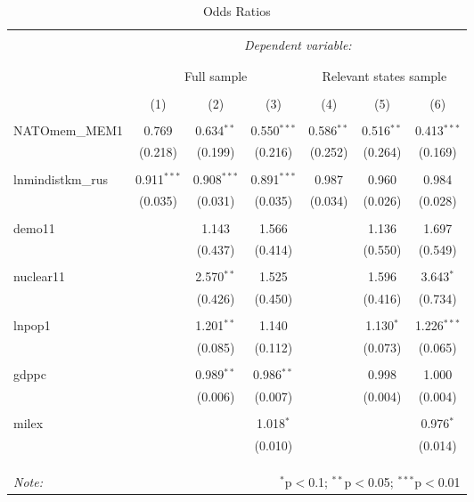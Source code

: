
\begin{table}[!htbp] \centering 
  \caption{Odds Ratios} 
  \label{} 
\begin{tabular}{@{\extracolsep{5pt}}lcccccc} 
\\[-1.8ex]\hline 
\hline \\[-1.8ex] 
 & \multicolumn{6}{c}{\textit{Dependent variable:}} \\ 
\cline{2-7} 
\\[-1.8ex] & \multicolumn{6}{c}{ } \\ 
 & \multicolumn{3}{c}{Full sample} & \multicolumn{3}{c}{Relevant states sample} \\ 
\\[-1.8ex] & (1) & (2) & (3) & (4) & (5) & (6)\\ 
\hline \\[-1.8ex] 
 NATOmem\_MEM1 & 0.769 & 0.634$^{**}$ & 0.550$^{***}$ & 0.586$^{**}$ & 0.516$^{**}$ & 0.413$^{***}$ \\ 
  & (0.218) & (0.199) & (0.216) & (0.252) & (0.264) & (0.169) \\ 
  & & & & & & \\ 
 lnmindistkm\_rus & 0.911$^{***}$ & 0.908$^{***}$ & 0.891$^{***}$ & 0.987 & 0.960 & 0.984 \\ 
  & (0.035) & (0.031) & (0.035) & (0.034) & (0.026) & (0.028) \\ 
  & & & & & & \\ 
 demo11 &  & 1.143 & 1.566 &  & 1.136 & 1.697 \\ 
  &  & (0.437) & (0.414) &  & (0.550) & (0.549) \\ 
  & & & & & & \\ 
 nuclear11 &  & 2.570$^{**}$ & 1.525 &  & 1.596 & 3.643$^{*}$ \\ 
  &  & (0.426) & (0.450) &  & (0.416) & (0.734) \\ 
  & & & & & & \\ 
 lnpop1 &  & 1.201$^{**}$ & 1.140 &  & 1.130$^{*}$ & 1.226$^{***}$ \\ 
  &  & (0.085) & (0.112) &  & (0.073) & (0.065) \\ 
  & & & & & & \\ 
 gdppc &  & 0.989$^{**}$ & 0.986$^{**}$ &  & 0.998 & 1.000 \\ 
  &  & (0.006) & (0.007) &  & (0.004) & (0.004) \\ 
  & & & & & & \\ 
 milex &  &  & 1.018$^{*}$ &  &  & 0.976$^{*}$ \\ 
  &  &  & (0.010) &  &  & (0.014) \\ 
  & & & & & & \\ 
\hline \\[-1.8ex] 
\hline 
\hline \\[-1.8ex] 
\textit{Note:}  & \multicolumn{6}{r}{$^{*}$p$<$0.1; $^{**}$p$<$0.05; $^{***}$p$<$0.01} \\ 
\end{tabular} 
\end{table} 

